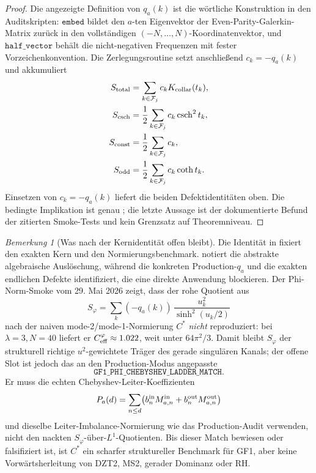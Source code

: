 \documentclass[11pt,a4paper]{article}
\theoremstyle{remark}
\newtheorem{remark}[remark]{Bemerkung}
\theoremstyle{plain}
\begin{document}
\begin{proof}
Die angezeigte Definition von \(q_a(k)\) ist die wörtliche Konstruktion in
den Auditskripten: \(\texttt{embed}\) bildet den \(a\)-ten Eigenvektor der
Even-Parity-Galerkin-Matrix zurück in den vollständigen
\((-N,\ldots,N)\)-Koordinatenvektor, und \(\texttt{half\_vector}\) behält
die nicht-negativen Frequenzen mit fester Vorzeichenkonvention. Die
Zerlegungsroutine setzt anschließend \(c_k=-q_a(k)\) und akkumuliert
\[
\begin{aligned}
  S_{\rm total}
    &= \sum_{k\in\mathcal{F}_j} c_k K_{\rm collar}(t_k),\\
  S_{\rm csch}
    &= \frac12\sum_{k\in\mathcal{F}_j} c_k \operatorname{csch}^2 t_k,\\
  S_{\rm const}
    &= \frac12\sum_{k\in\mathcal{F}_j} c_k,\\
  S_{\rm odd}
    &= \frac12\sum_{k\in\mathcal{F}_j} c_k \coth t_k.
\end{aligned}
\]
Einsetzen von \(c_k=-q_a(k)\) liefert die beiden Defektidentitäten oben.
Die bedingte Implikation ist genau
; die letzte Aussage ist der
dokumentierte Befund der zitierten Smoke-Tests und kein Grenzsatz auf
Theoremniveau.
\end{proof}

\begin{remark}[Was nach der Kernidentität offen bleibt]
\label{rem:gf1-phi-cheb-ladder-open}
Die Identität in  fixiert den exakten
Kern und den Normierungsbenchmark. 
notiert die abstrakte algebraische Auslöschung, während
 die konkreten
Production-\(q_a\) und die exakten endlichen Defekte identifiziert, die
eine direkte Anwendung blockieren. Der Phi-Norm-Smoke
vom 29. Mai 2026 zeigt, dass der rohe Quotient
aus
\[
  S_\varphi=\sum_k(-q_a(k))\,
      \frac{u_k^2}{\sinh^2(u_k/2)}
\]
nach der naiven mode-2/mode-1-Normierung \(C^*\) \emph{nicht}
reproduziert: bei \(\lambda=3,N=40\) liefert er
\(C_{\rm eff}^{\varphi}\approx1.022\), weit unter
\(64\pi^2/3\). Damit bleibt \(S_\varphi\) der strukturell richtige
\(u^2\)-gewichtete Träger des gerade singulären Kanals; der offene Slot
ist jedoch das an den Production-Modus angepasste
\[
  \texttt{GF1\_PHI\_CHEBYSHEV\_LADDER\_MATCH}.
\]
Er muss die echten Chebyshev-Leiter-Koeffizienten
\[
  P_a(d)=\sum_{n\le d}\bigl(b_n^{\rm in}M_{a,n}^{\rm in}
        +b_n^{\rm out}M_{a,n}^{\rm out}\bigr)
\]
und dieselbe Leiter-Imbalance-Normierung wie das Production-Audit
verwenden, nicht den nackten \(S_\varphi\)-über-\(L^1\)-Quotienten. Bis
dieser Match bewiesen oder falsifiziert ist, ist \(C^*\) ein scharfer
struktureller Benchmark für GF1, aber keine Vorwärtsherleitung von DZT2,
MS2, gerader Dominanz oder RH.
\end{remark}
\end{document}

